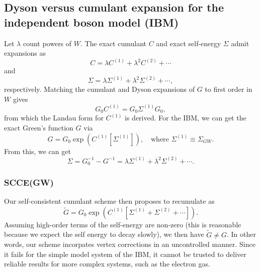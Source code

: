 \subsection{Dyson versus cumulant expansion for the independent boson model (IBM)}
Let $\lambda$ count powers of $W$. The exact cumulant $C$ and exact self-energy $\Sigma$ admit expansions as 
\begin{equation}
    C=\lambda C^{(1)}+\lambda^2 C^{(2)}+\cdots
\end{equation}
and
\begin{equation}
    \Sigma=\lambda \Sigma^{(1)}+\lambda^2 \Sigma^{(2)}+\cdots,
\end{equation}
respectively. 
Matching the cumulant and Dyson expansions of $G$ to first order in $W$ gives
\begin{equation}
    G_0 C^{(1)}=G_0 \Sigma^{(1)} G_0,
\end{equation}
 from which the Landau form for $C^{(1)}$ is derived. For the IBM, we can get the exact Green's function $G$ via
\begin{equation}
    G=G_0 \exp(C^{(1)}[\Sigma^{(1)}]), \quad \text{where } \Sigma^{(1)}\equiv \Sigma_{GW}.
\end{equation}
From this, we can get
\begin{equation}
    \Sigma = G_0^{-1} - G^{-1} = \lambda \Sigma^{(1)} + \lambda^2 \Sigma^{(2)} + \cdots.
\end{equation}
\subsubsection{SCCE(GW)}
Our self-consistent cumulant scheme then proposes to recumulate as
\begin{equation}
    \tilde{G}=G_0 \exp(C^{(1)}[\Sigma^{(1)} + \Sigma^{(2)} + \cdots]).
\end{equation}
Assuming high-order terms of the self-energy are non-zero (this is reasonable because we expect the self energy to decay slowly), we then have $\tilde{G}\neq G$. In other words, our scheme incorpates vertex corrections in an uncontrolled manner. Since it fails for the simple model system of the IBM, it cannot be trusted to deliver reliable results for more complex systems, such as the electron gas.
